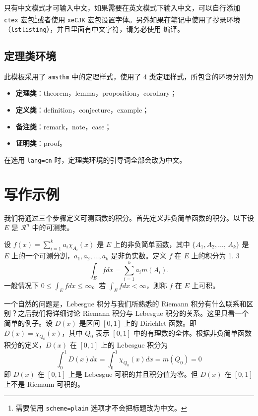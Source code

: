 \documentclass[cn,hazy,blue,10.5pt,normal]{elegantnote}
\begin{document}
\begin{note}
只有中文模式才可输入中文，如果需要在英文模式下输入中文，可以自行添加 \lstinline{ctex} 宏包\footnote{需要使用 \lstinline{scheme=plain} 选项才不会把标题改为中文。}或者使用 \lstinline{xeCJK} 宏包设置字体。另外如果在笔记中使用了抄录环境（\lstinline{lstlisting}），并且里面有中文字符，请务必使用  编译。
\end{note}


\subsection{定理类环境}

此模板采用了 \lstinline{amsthm} 中的定理样式，使用了 4 类定理样式，所包含的环境分别为
\begin{itemize}
  \item \textbf{定理类}：theorem，lemma，proposition，corollary；
  \item \textbf{定义类}：definition，conjecture，example；
  \item \textbf{备注类}：remark，note，case；
  \item \textbf{证明类}：proof。
\end{itemize}

\begin{remark}
在选用 \lstinline{lang=cn} 时，定理类环境的引导词全部会改为中文。
\end{remark}


\section{写作示例}

我们将通过三个步骤定义可测函数的积分。首先定义非负简单函数的积分。以下设 $E$ 是 $\mathcal{R}^n$ 中的可测集。

\begin{definition}[可积性]
设 $ f(x)=\sum\limits_{i=1}^{k} a_i \chi_{A_i}(x)$ 是 $E$ 上的非负简单函数，其中 $\{A_1,A_2,\ldots$, $A_k\}$ 是 $E$ 上的一个可测分割，$a_1,a_2,\ldots,a_k$ 是非负实数。定义 $f$ 在 $E$ 上的积分为 1. 3
\begin{equation}
   \label{inter}
   \int_{E} f dx = \sum_{i=1}^k a_i m(A_i).
\end{equation}
一般情况下 $0 \leq \int_{E} f dx \leq \infty$。若 $\int_{E} f dx < \infty$，则称 $f$ 在 $E$ 上可积。
\end{definition}

一个自然的问题是，Lebesgue 积分与我们所熟悉的 Riemann 积分有什么联系和区别？之后我们将详细讨论 Riemann 积分与 Lebesgue 积分的关系。这里只看一个简单的例子。设 $D(x)$ 是区间 $[0,1]$ 上的 Dirichlet 函数。即 $D(x)=\chi_{Q_0}(x)$，其中 $Q_0$ 表示 $[0,1]$ 中的有理数的全体。根据非负简单函数积分的定义，$D(x)$ 在 $[0,1]$ 上的 Lebesgue 积分为
\begin{equation}\label{inter2}
  \int_0^1 D(x)dx = \int_0^1 \chi_{Q_0} (x) dx = m(Q_0) = 0
\end{equation}
即 $D(x)$ 在 $[0,1]$ 上是 Lebesgue 可积的并且积分值为零。但 $D(x)$ 在 $[0,1]$ 上不是 Riemann 可积的。
\end{document}
